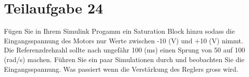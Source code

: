 \section{Teilaufgabe 24}
\begin{aufgabe}
Fügen Sie in Ihrem Simulink Progamm ein Saturation Block hinzu sodass die 
Eingangsspannung des Motors nur Werte zwischen -10 (V) und +10 (V) nimmt. Die 
Referenzdrehzahl sollte nach ungefähr 100 (ms) einen Sprung von 50 auf 100 
(rad/s) machen. Führen Sie ein paar Simulationen durch und beobachten Sie die 
Eingangsspannung. Was passiert wenn die Verstärkung des Reglers gross wird.
\end{aufgabe}
